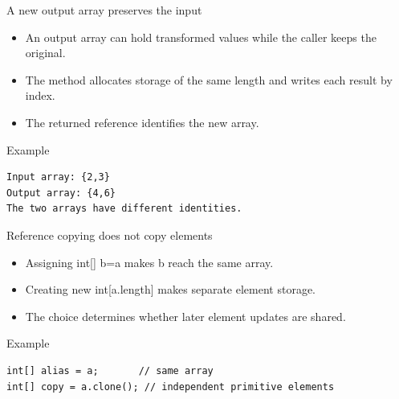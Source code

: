 \documentclass[10pt,aspectratio=169]{beamer}
\begin{document}
\begin{frame}[fragile,t]{A new output array preserves the input}
\begin{itemize}
\item An output array can hold transformed values while the caller keeps the original.
\item The method allocates storage of the same length and writes each result by index.
\item The returned reference identifies the new array.
\end{itemize}
\vspace{1mm}\begin{block}{Example}
\begin{lstlisting}
Input array: {2,3}
Output array: {4,6}
The two arrays have different identities.
\end{lstlisting}
\end{block}
\end{frame}

\begin{frame}[fragile,t]{Reference copying does not copy elements}
\begin{itemize}
\item Assigning int[] b=a makes b reach the same array.
\item Creating new int[a.length] makes separate element storage.
\item The choice determines whether later element updates are shared.
\end{itemize}
\vspace{1mm}\begin{block}{Example}
\begin{lstlisting}
int[] alias = a;       // same array
int[] copy = a.clone(); // independent primitive elements
\end{lstlisting}
\end{block}
\end{frame}
\end{document}

